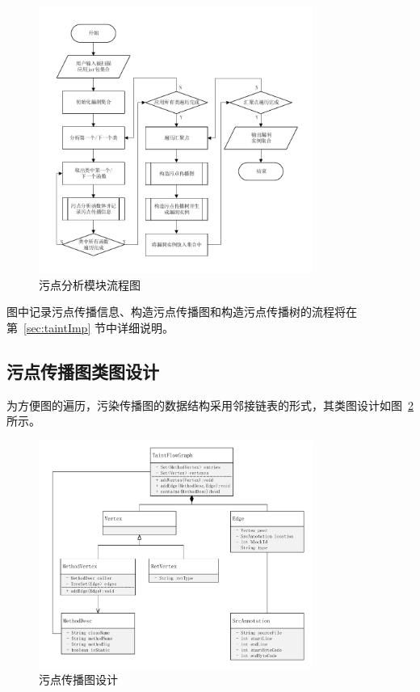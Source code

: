 \begin{figure}[!htb]
	\centering
	\includegraphics[width=0.8\textwidth]{FIGs/chapter3/taintprocessing.pdf}
	\caption{污点分析模块流程图}\label{taintprocess}
\end{figure}

图中记录污点传播信息、构造污点传播图和构造污点传播树的流程将在第~\ref{sec:taintImp} 节中详细说明。

\subsection{污点传播图类图设计}

为方便图的遍历，污染传播图的数据结构采用邻接链表的形式，其类图设计如图~\ref{taintGraphClass} 所示。

\begin{figure}[!htb]
	\centering
	\includegraphics[width=0.8\textwidth]{FIGs/chapter3/taintGraphClass.pdf}
	\caption{污点传播图设计}\label{taintGraphClass}
\end{figure}

